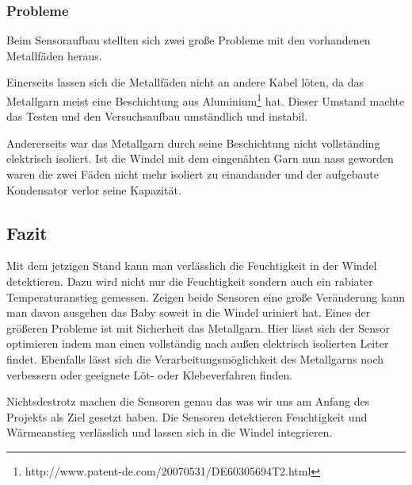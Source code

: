 \subsubsection{Probleme}
Beim Sensoraufbau stellten sich zwei große Probleme mit den vorhandenen Metallfäden heraus.

Einerseits lassen sich die Metallfäden nicht an andere Kabel löten, da das Metallgarn meist eine Beschichtung aus Aluminium\footnote{http://www.patent-de.com/20070531/DE60305694T2.html} hat. Dieser Umstand machte das Testen und den Versuchsaufbau umständlich und instabil.

Andererseits war das Metallgarn durch seine Beschichtung nicht vollständing elektrisch isoliert. Ist die Windel mit dem eingenähten Garn nun nass geworden waren die zwei Fäden nicht mehr isoliert zu einandander und der aufgebaute Kondensator verlor seine Kapazität. 

\subsection{Fazit}
Mit dem jetzigen Stand kann man verlässlich die Feuchtigkeit in der Windel detektieren. Dazu wird nicht nur die Feuchtigkeit sondern auch ein rabiater Temperaturanstieg gemessen. Zeigen beide Sensoren eine große Veränderung kann man davon ausgehen das Baby soweit in die Windel uriniert hat. 
Eines der größeren Probleme ist mit Sicherheit das Metallgarn. Hier lässt sich der Sensor optimieren indem man einen vollständig nach außen elektrisch isolierten Leiter findet. Ebenfalls lässt sich die Verarbeitungsmöglichkeit des Metallgarns noch verbessern oder geeignete Löt- oder Klebeverfahren finden.

Nichtsdestrotz machen die Sensoren genau das was wir uns am Anfang des Projekts als Ziel gesetzt haben. Die Sensoren detektieren Feuchtigkeit und Wärmeanstieg verlässlich und lassen sich in die Windel integrieren. 

\pagebreak
